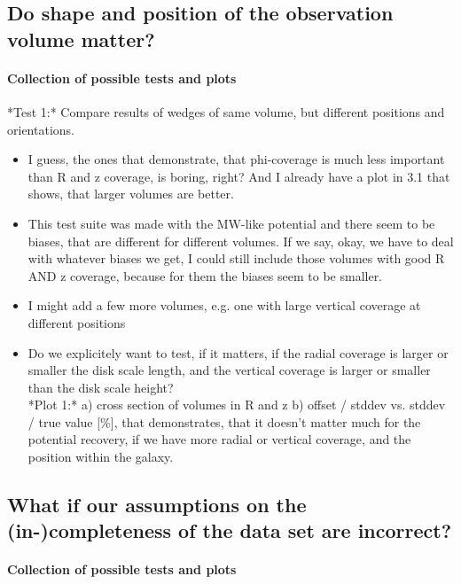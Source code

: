 \documentclass[12pt,preprint]{aastex}
\begin{document}
\subsection{Do shape and position of the observation volume matter?}

\paragraph{Collection of possible tests and plots}

 *Test 1:* Compare results of wedges of same volume, but different positions and orientations. 
 \begin{itemize}
    \item I guess, the ones that demonstrate, that phi-coverage is much less important than R and z coverage, is boring, right? And I already have a plot in 3.1 that shows, that larger volumes are better. 
    \item This test suite was made with the MW-like potential and there seem to be biases, that are different for different volumes. If we say, okay, we have to deal with whatever biases we get, I could still include those volumes with good R AND z coverage, because for them the biases seem to be smaller.
    \item I might add a few more volumes, e.g. one with large vertical coverage at different positions
    \item Do we explicitely want to test, if it matters, if the radial coverage is larger or smaller the disk scale length, and the vertical coverage is larger or smaller than the disk scale height?\\
*Plot 1:* 
    a) cross section of volumes in R and z
    b) offset / stddev vs. stddev / true value [\%], that demonstrates, that it doesn't matter much for the potential recovery, if we have more radial or vertical coverage, and the position within the galaxy. 
     \end{itemize}
     
\subsection{What if our assumptions on the (in-)completeness of the data set are incorrect?}

\paragraph{Collection of possible tests and plots}
\end{document}
